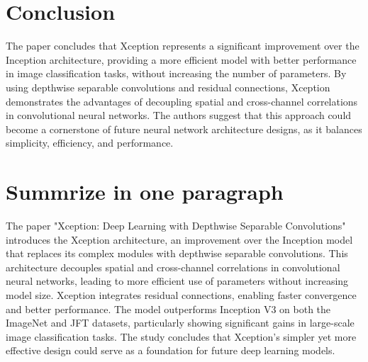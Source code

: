 \documentclass{report}
\begin{document}
	\section{Conclusion}
	The paper concludes that Xception represents a significant improvement over the Inception architecture, providing a more efficient model with better performance in image classification tasks, without increasing the number of parameters. By using depthwise separable convolutions and residual connections, Xception demonstrates the advantages of decoupling spatial and cross-channel correlations in convolutional neural networks. The authors suggest that this approach could become a cornerstone of future neural network architecture designs, as it balances simplicity, efficiency, and performance.
	
	\section{Summrize in one paragraph}
	The paper "Xception: Deep Learning with Depthwise Separable Convolutions" introduces the Xception architecture, an improvement over the Inception model that replaces its complex modules with depthwise separable convolutions. This architecture decouples spatial and cross-channel correlations in convolutional neural networks, leading to more efficient use of parameters without increasing model size. Xception integrates residual connections, enabling faster convergence and better performance. The model outperforms Inception V3 on both the ImageNet and JFT datasets, particularly showing significant gains in large-scale image classification tasks. The study concludes that Xception's simpler yet more effective design could serve as a foundation for future deep learning models.
	
	
	
	
	
	
	
	
	
	
	
	\newpage
	
	
	
\end{document}
